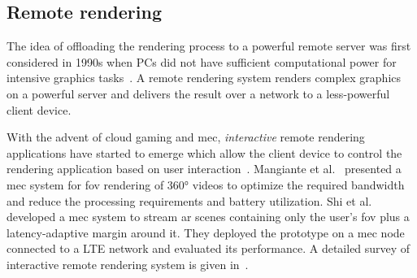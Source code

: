 \documentclass[sigconf]{acmart}			%
\begin{document}
\subsection{Remote rendering}
\label{sec:remote}
The idea of offloading the rendering process to a powerful remote server was first considered in 1990s when PCs did not have sufficient computational power for intensive graphics tasks~\cite{shi2015}.
A remote rendering system renders complex graphics on a powerful server and delivers the result over a network to a less-powerful client device.

With the advent of cloud gaming and \gls{mec}, \emph{interactive} remote rendering applications have started to emerge which allow the client device to control the rendering application based on user interaction~\cite{mangiante2017, shi2019, qian2019}.
Mangiante et al.~\cite{mangiante2017} presented a \gls{mec} system for \gls{fov} rendering of \ang{360} videos to optimize the required bandwidth and reduce the processing requirements and battery utilization.
Shi et al.~\cite{shi2019} developed a \gls{mec} system to stream \gls{ar} scenes containing only the user's \gls{fov} plus a latency-adaptive margin around it. 
They deployed the prototype on a \gls{mec} node connected to a LTE network and evaluated its performance.
A detailed survey of interactive remote rendering system is given in~\cite{shi2015}.
\end{document}
